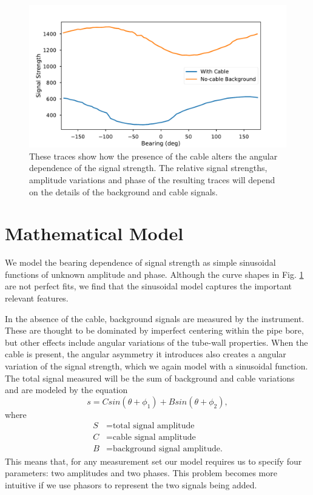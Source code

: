 \documentclass[paper=a4, fontsize=11pt]{scrartcl}
\numberwithin{equation}{section}		%
\numberwithin{figure}{section}			%
\numberwithin{table}{section}				%
\begin{document}
\begin{figure}[h]
  \caption{These traces show how the presence of the cable alters the angular dependence of the signal strength.  The relative signal strengths, amplitude variations and phase of the resulting traces will depend on the details of the background and cable signals.}
  \label{fig:sample_bearing_trace}
  \centering
  \includegraphics[width=1.0\textwidth]{figures/sample_bearing_trace.pdf}
\end{figure}

\section{Mathematical Model}
We model the bearing dependence of signal strength as simple sinusoidal functions of unknown amplitude and phase.  Although the curve shapes in Fig. \ref{fig:sample_bearing_trace} are not perfect fits, we find that the sinusoidal model captures the important relevant features.
\par In the absence of the cable, background signals are measured by the instrument.  These are thought to be dominated by imperfect centering within the pipe bore, but other effects include angular variations of the tube-wall properties.  When the cable is present, the angular asymmetry it introduces also creates a angular variation of the signal strength, which we again model with a sinusoidal function.  The total signal measured will be the sum of background and cable variations and are modeled by the equation
\begin{equation} \label{eq:trig_sig}
    s = C sin\left(\theta + \phi_1\right) + B sin\left(\theta + \phi_2\right),
\end{equation}
where
\begin{align}
        S &= \text{total signal amplitude} \\
        C &= \text{cable signal amplitude} \\
        B &= \text{background signal amplitude.}
\end{align}
This means that, for any measurement set our model requires us to specify four parameters: two amplitudes and two phases.  This problem becomes more intuitive if we use phasors to represent the two signals being added.
\end{document}
